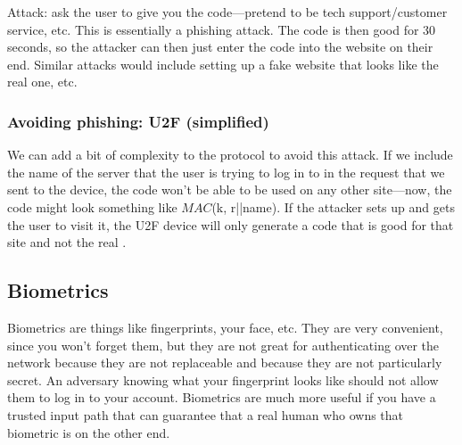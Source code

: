 Attack: ask the user to give you the code---pretend to be tech support/customer service, etc. This is essentially a phishing attack. The code is then good for 30 seconds, so the attacker can then just enter the code into the website on their end. Similar attacks would include setting up a fake website that looks like the real one, etc.

\subsubsection{Avoiding phishing: U2F (simplified)}
We can add a bit of complexity to the protocol to avoid this attack. If we include the name of the server that the user is trying to log in to in the request that we sent to the device, the code won't be able to be used on any other site---now, the code might look something like $MAC$(k, r||name). If the attacker sets up  and gets the user to visit it, the U2F device will only generate a code that is good for that site and not the real . 
	
\subsection{Biometrics}
Biometrics are things like fingerprints, your face, etc. They are very convenient, since you won't forget them, but they are not great for authenticating over the network because they are not replaceable and because they are not particularly secret. An adversary knowing what your fingerprint looks like should not allow them to log in to your account. Biometrics are much more useful if you have a trusted input path that can guarantee that a real human who owns that biometric is on the other end.

